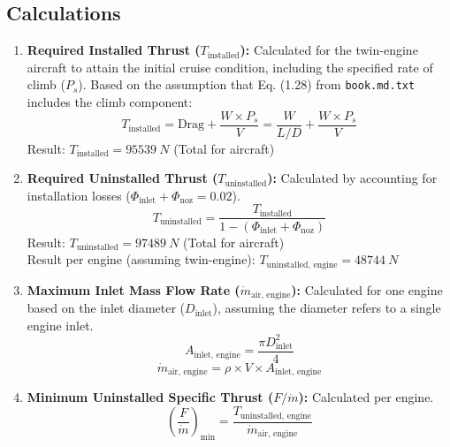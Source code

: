 \documentclass{article}
\begin{document}
\subsection{Calculations}
\begin{enumerate}
    \item \textbf{Required Installed Thrust ($T_{\text{installed}}$):} Calculated for the twin-engine aircraft to attain the initial cruise condition, including the specified rate of climb ($P_s$). Based on the assumption that Eq. (1.28) from \texttt{book.md.txt} includes the climb component:
    \begin{equation*}
        T_{\text{installed}} = \text{Drag} + \frac{W \times P_s}{V} = \frac{W}{L/D} + \frac{W \times P_s}{V}
    \end{equation*}
    Result: $T_{\text{installed}} = \SI{95539}{N}$ (Total for aircraft)

    \item \textbf{Required Uninstalled Thrust ($T_{\text{uninstalled}}$):} Calculated by accounting for installation losses ($\Phi_{\text{inlet}} + \Phi_{\text{noz}} = 0.02$).
    \begin{equation*}
        T_{\text{uninstalled}} = \frac{T_{\text{installed}}}{1 - (\Phi_{\text{inlet}} + \Phi_{\text{noz}})}
    \end{equation*}
    Result: $T_{\text{uninstalled}} = \SI{97489}{N}$ (Total for aircraft) \\
    Result per engine (assuming twin-engine): $T_{\text{uninstalled, engine}} = \SI{48744}{N}$

    \item \textbf{Maximum Inlet Mass Flow Rate ($\dot{m}_{\text{air, engine}}$):} Calculated for one engine based on the inlet diameter ($D_{\text{inlet}}$), assuming the diameter refers to a single engine inlet.
    \begin{equation*}
        A_{\text{inlet, engine}} = \frac{\pi D_{\text{inlet}}^2}{4}
    \end{equation*}
    \begin{equation*}
        \dot{m}_{\text{air, engine}} = \rho \times V \times A_{\text{inlet, engine}}
    \end{equation*}

    \item \textbf{Minimum Uninstalled Specific Thrust ($F/\dot{m}$):} Calculated per engine.
    \begin{equation*}
        \left( \frac{F}{\dot{m}} \right)_{\text{min}} = \frac{T_{\text{uninstalled, engine}}}{\dot{m}_{\text{air, engine}}}
    \end{equation*}
\end{enumerate}
\end{document}
